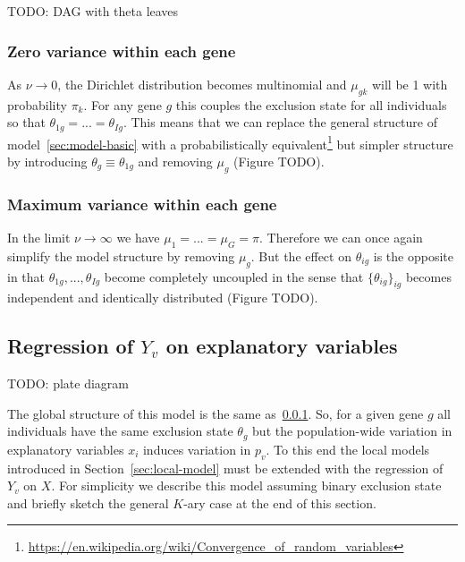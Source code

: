 \documentclass[letterpaper]{article}
\begin{document}
TODO: DAG with theta leaves

\subsubsection{Zero variance within each gene}
\label{sec:model-basic-nu-0}

As \(\nu\rightarrow 0\), the Dirichlet distribution becomes multinomial and
\(\mu_{gk}\) will be 1 with probability \(\pi_k\).  For any gene \(g\) this
couples the exclusion state for all individuals so that
\(\theta_{1g}=...=\theta_{Ig}\).  This means that we can replace the general
structure of model~\ref{sec:model-basic} with a probabilistically
equivalent\footnote{
\url{https://en.wikipedia.org/wiki/Convergence_of_random_variables}} but
simpler structure by introducing \(\theta_g\equiv\theta_{1g}\) and removing
\(\mu_g\) (Figure TODO).

\subsubsection{Maximum variance within each gene}
\label{sec:model-basic-nu-infinit}

In the limit \(\nu\rightarrow\infty\) we have \(\mu_1=...=\mu_G=\pi\).
Therefore we can once again simplify the model structure by removing
\(\mu_g\).  But the effect on \(\theta_{ig}\) is the opposite in that
\(\theta_{1g},...,\theta_{Ig}\) become completely uncoupled in the sense that
\(\{\theta_{ig}\}_{ig}\) becomes independent and identically distributed
(Figure TODO).

\subsection{Regression of \(Y_v\) on explanatory variables }
\label{sec:model-Y-regr}

TODO: plate diagram

The global structure of this model is the same as~\ref{sec:model-basic-nu-0}.
So, for a given gene \(g\) all individuals have the same exclusion state
\(\theta_g\) but the population-wide variation in explanatory variables
\(x_i\) induces variation in \(p_v\).  To this end the local models introduced
in Section~\ref{sec:local-model} must be extended with the regression of
\(Y_v\) on \(X\).  For simplicity we describe this model assuming binary
exclusion state and briefly sketch the general \(K\)-ary case at the end of
this section.
\end{document}
